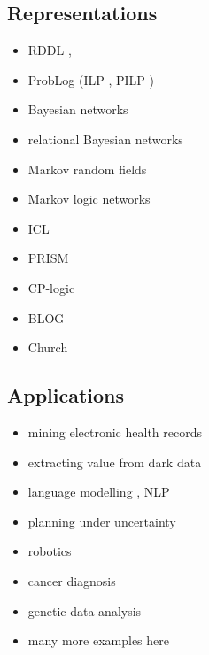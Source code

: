 \documentclass{article}
\begin{document}
\subsection{Representations}

\begin{itemize}
\item RDDL \cite{sanner2010relational},
\item ProbLog \cite{DBLP:conf/ijcai/RaedtKT07} (ILP
  \cite{DBLP:journals/ngc/Muggleton91}, PILP \cite{DBLP:conf/ilp/2008p})
\item Bayesian networks \cite{DBLP:books/daglib/0066829}
\item relational Bayesian networks \cite{DBLP:conf/uai/Jaeger97}
\item Markov random fields \cite{spitzer1971markov}
\item Markov logic networks \cite{DBLP:journals/ml/RichardsonD06}
\item ICL \cite{DBLP:journals/ai/Poole97}
\item PRISM \cite{DBLP:conf/ijcai/SatoK97}
\item CP-logic \cite{DBLP:journals/tplp/VennekensDB09}
\item BLOG \cite{DBLP:conf/ijcai/MilchMRSOK05}
\item Church \cite{DBLP:conf/uai/GoodmanMRBT08}
\end{itemize}

\subsection{Applications}

\begin{itemize}
\item mining electronic health records \cite{DBLP:conf/iaai/NatarajanKIJC13}
\item extracting value from dark data
  \cite{DBLP:journals/ijswis/NiuZRS12,DBLP:conf/emnlp/VenugopalCGN14}
\item language modelling \cite{DBLP:conf/icml/JerniteRS15}, NLP
  \cite{DBLP:conf/ijcai/DriesKDBR17}
\item planning under uncertainty \cite{DBLP:journals/jair/BoutilierDH99}
\item robotics \cite{DBLP:journals/ras/BeetzJMT10,DBLP:conf/icra/MoldovanMOSR12}
\item cancer diagnosis \cite{DBLP:conf/ilp/Corte-RealD017}
\item genetic data analysis \cite{DBLP:journals/nar/MaeyerWRRM15}
\item many more examples here \cite{DBLP:series/synthesis/2016Raedt}
\end{itemize}
\end{document}
